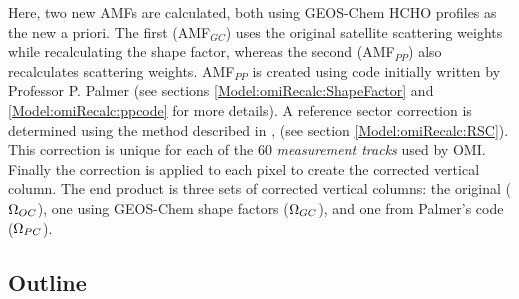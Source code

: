   Here, two new AMFs are calculated, both using GEOS-Chem HCHO profiles as the new a priori. 
  The first (AMF$_{GC}$) uses the original satellite scattering weights while recalculating the shape factor, whereas the second (AMF$_{PP}$) also recalculates scattering weights.
  AMF$_{PP}$ is created using code initially written by Professor P. Palmer (see sections \ref{Model:omiRecalc:ShapeFactor} and \ref{Model:omiRecalc:ppcode} for more details).
  A reference sector correction is determined using the method described in \textcite{Abad2016}, (see section \ref{Model:omiRecalc:RSC}).
  This correction is unique for each of the 60 \textit{measurement tracks} used by OMI.
  Finally the correction is applied to each pixel to create the corrected vertical column. 
  The end product is three sets of corrected vertical columns: the original ($\Omega_{OC}$), one using GEOS-Chem shape factors ($\Omega_{GC}$), and one from Palmer's code ($\Omega_{PC}$).
  
  \subsection{Outline}
    \label{Model:omiRecalc:outline}
    

